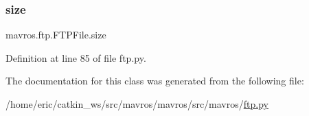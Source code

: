 \subsubsection{\texorpdfstring{size}{size}}
{\footnotesize\ttfamily mavros.\+ftp.\+F\+T\+P\+File.\+size}



Definition at line 85 of file ftp.\+py.



The documentation for this class was generated from the following file\+:\begin{DoxyCompactItemize}
\item 
/home/eric/catkin\+\_\+ws/src/mavros/mavros/src/mavros/\mbox{\hyperlink{ftp_8py}{ftp.\+py}}\end{DoxyCompactItemize}
